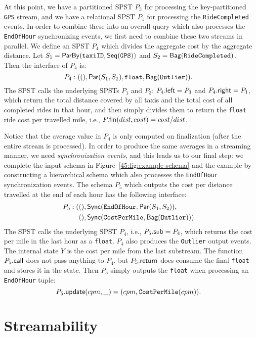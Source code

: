 At this point, we have a partitioned SPST $P_3$ for processing
the key-partitioned \texttt{GPS} stream,
and we have a relational SPST $P_1$ for processing the
\texttt{RideCompleted} events.
In order to combine these into
an overall query
which also processes the \texttt{EndOfHour}
synchronizing events,
we first need to combine these two streams in parallel.
We define an SPST $P_4$ which
divides the aggregate cost by the aggregate distance.
Let $S_1 = \mathsf{ParBy}({\texttt{taxiID}}, \mathsf{Seq}({ \texttt{GPS} }))$
and $S_2 = \mathsf{Bag}({ \texttt{RideCompleted} })$.
Then the interface of $P_4$ is:
\[
P_4: ((), \mathsf{Par}({S_1}, {S_2}), \texttt{float}, \mathsf{Bag}({ \texttt{Outlier} })).
\]
The SPST calls the underlying SPSTs $P_1$ and $P_3$: ${P_4}.{\mathsf{left}} = P_3$ and ${P_4}.{\mathsf{right}} = P_1$, which return the total distance covered by all taxis and the total cost of all completed rides in that hour,
and then simply divides them to return the \texttt{float} ride cost per travelled mile, i.e., ${P}.{\mathsf{fin}}(dist, cost) = cost / dist$.

Notice that the average value in $P_4$
is only computed on finalization (after the entire stream is processed).
In order to produce the same averages in a streaming manner,
we need \emph{synchronization events},
and this leads us to our final step:
we complete the input schema in Figure~\ref{45:fig:example-schema}
and the example by constructing a hierarchical schema
which also processes
the \texttt{EndOfHour} synchronization events.
The schema $P_5$ which outputs the cost per distance travelled
at the end of each hour
has the following interface:
\begin{align*}
P_5: (
    &(), \mathsf{Sync}({ \texttt{EndOfHour} },  \mathsf{Par}({S_1}, {S_2}) ), \\
    &(), \mathsf{Sync}({ \texttt{CostPerMile} },  \mathsf{Bag}({\texttt{Outlier}}) )
)
\end{align*}
The SPST calls the underlying SPST $P_4$, i.e., ${P_5}.{\mathsf{sub}} = P_4$,  which returns the cost per mile in the last hour as a \texttt{float}.
$P_4$ also produces the \texttt{Outlier} output events.
The internal state $Y$ is the cost per mile
from the last substream.
The function ${P_5}.{\mathsf{call}}$
does not pass anything to $P_4$,
but ${P_5}.{\mathsf{return}}$ does consume the final \texttt{float}
and stores it in the state.
Then $P_5$ simply outputs the \texttt{float} when processing an \texttt{EndOfHour} tuple:
\[
{P_5}.{\mathsf{update}}(cpm, \_) = (cpm, \texttt{CostPerMile}(cpm)).
\]

\section{Streamability}
\label{45:sec:theorems}

